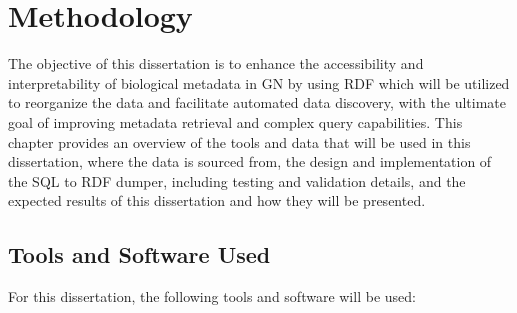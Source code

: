 \chapter{Methodology}

The objective of this dissertation is to enhance the accessibility and interpretability of biological metadata in GN by using RDF which will be utilized to reorganize the data and facilitate automated data discovery, with the ultimate goal of improving metadata retrieval and complex query capabilities.  This chapter provides an overview of the tools and data that will be used in this dissertation, where the data is sourced from, the design and implementation of the SQL to RDF dumper, including testing and validation details, and the expected results of this dissertation and how they will be presented.

\section{Tools and Software Used}

For this dissertation, the following tools and software will be used:

